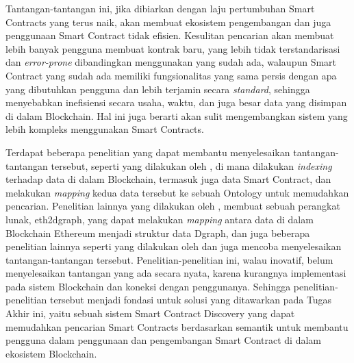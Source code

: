 Tantangan-tantangan ini, jika dibiarkan dengan laju pertumbuhan Smart Contracts yang terus naik, akan membuat ekosistem pengembangan dan juga penggunaan Smart Contract tidak efisien. Kesulitan pencarian akan membuat lebih banyak pengguna membuat kontrak baru, yang lebih tidak terstandarisasi dan \textit{error-prone} dibandingkan menggunakan yang sudah ada, walaupun Smart Contract yang sudah ada memiliki fungsionalitas yang sama persis dengan apa yang dibutuhkan pengguna dan lebih terjamin secara \textit{standard}, sehingga menyebabkan inefisiensi secara usaha, waktu, dan juga besar data yang disimpan di dalam Blockchain. Hal ini juga berarti akan sulit mengembangkan sistem yang lebih kompleks menggunakan Smart Contracts.

Terdapat beberapa penelitian yang dapat membantu menyelesaikan tantangan-tantangan tersebut, seperti yang dilakukan oleh \cite{third2017linked}, di mana dilakukan \textit{indexing} terhadap data di dalam Blockchain, termasuk juga data Smart Contract, dan melakukan \textit{mapping} kedua data tersebut ke sebuah Ontology untuk memudahkan pencarian. Penelitian lainnya yang dilakukan oleh \cite{aimar2023extraction}, membuat sebuah perangkat lunak, eth2dgraph, yang dapat melakukan \textit{mapping} antara data di dalam Blockchain Ethereum menjadi struktur data Dgraph, dan juga beberapa penelitian lainnya seperti yang dilakukan oleh \cite{baqa2019semantic} dan \cite{cano2021toward} juga mencoba menyelesaikan tantangan-tantangan tersebut. Penelitian-penelitian ini, walau inovatif, belum menyelesaikan tantangan yang ada secara nyata, karena kurangnya implementasi pada sistem Blockchain dan koneksi dengan penggunanya. Sehingga penelitian-penelitian tersebut menjadi fondasi untuk solusi yang ditawarkan pada Tugas Akhir ini, yaitu sebuah sistem Smart Contract Discovery yang dapat memudahkan pencarian Smart Contracts berdasarkan semantik untuk membantu pengguna dalam penggunaan dan pengembangan Smart Contract di dalam ekosistem Blockchain.



